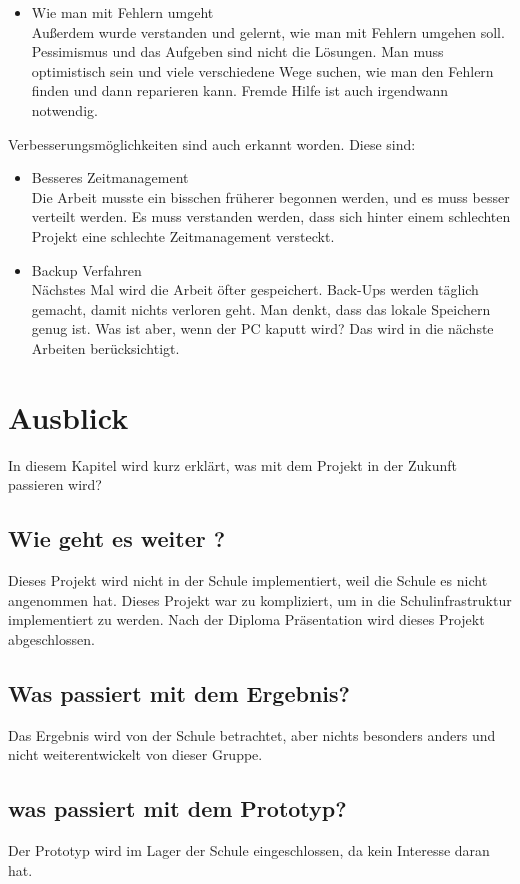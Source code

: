 \begin{itemize}
	\item Wie man mit Fehlern umgeht \\
	
	Außerdem wurde verstanden und gelernt, wie man mit Fehlern umgehen soll. Pessimismus und das Aufgeben sind nicht die Lösungen. Man muss optimistisch sein und viele verschiedene Wege suchen, wie man den Fehlern finden und dann reparieren kann. Fremde Hilfe ist auch irgendwann notwendig.
\end{itemize}	
	 Verbesserungsmöglichkeiten sind auch erkannt worden. Diese sind: 
\begin{itemize}	
	
	\item Besseres Zeitmanagement \\
	
	Die Arbeit musste ein bisschen früherer begonnen werden, und es muss besser verteilt werden. Es muss verstanden werden, dass sich hinter einem schlechten Projekt eine schlechte Zeitmanagement versteckt.
	
	\item Backup Verfahren \\
	
	Nächstes Mal wird die Arbeit öfter gespeichert. Back-Ups werden täglich gemacht, damit nichts verloren geht. Man denkt, dass das lokale Speichern genug ist. Was ist aber, wenn der PC kaputt wird? Das wird in die nächste Arbeiten berücksichtigt.
\end{itemize}

\chapter{Ausblick}
In diesem Kapitel wird kurz erkl\"art, was mit dem Projekt in der Zukunft passieren wird?
\section{Wie geht es weiter ?}
Dieses Projekt wird nicht in der Schule implementiert, weil die Schule es nicht angenommen hat. Dieses Projekt war zu kompliziert, um in die Schulinfrastruktur implementiert zu werden. Nach der Diploma Präsentation wird dieses Projekt abgeschlossen.
\section{Was passiert mit dem Ergebnis?}
Das Ergebnis wird von der Schule betrachtet, aber nichts besonders anders und nicht weiterentwickelt von dieser Gruppe.
\section{was passiert mit dem Prototyp?}
Der Prototyp wird im Lager der Schule eingeschlossen, da kein Interesse daran hat. 
